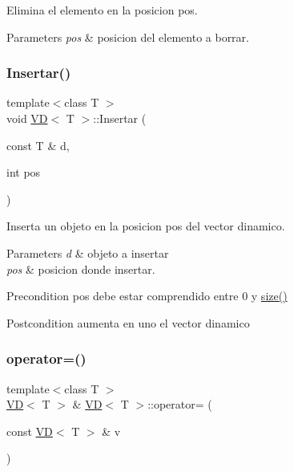 Elimina el elemento en la posicion pos. 


\begin{DoxyParams}{Parameters}
{\em pos} & posicion del elemento a borrar. \\
\hline
\end{DoxyParams}
\mbox{\label{class_v_d_aded65b5f02cceb9780303afd5c88acb8}} 
\subsubsection{\texorpdfstring{Insertar()}{Insertar()}}
{\footnotesize\ttfamily template$<$class T $>$ \\
void \hyperlink{class_v_d}{VD}$<$ T $>$\+::Insertar (\begin{DoxyParamCaption}\item[{const T \&}]{d,  }\item[{int}]{pos }\end{DoxyParamCaption})}



Inserta un objeto en la posicion pos del vector dinamico. 


\begin{DoxyParams}{Parameters}
{\em d} & objeto a insertar \\
\hline
{\em pos} & posicion donde insertar. \\
\hline
\end{DoxyParams}
\begin{DoxyPrecond}{Precondition}
pos debe estar comprendido entre 0 y \hyperlink{class_v_d_a411ad026db1c8e0617d9031f1f1017a5}{size()} 
\end{DoxyPrecond}
\begin{DoxyPostcond}{Postcondition}
aumenta en uno el vector dinamico 
\end{DoxyPostcond}
\mbox{\label{class_v_d_a645b65a6343059cd921f6a2856c97249}} 
\subsubsection{\texorpdfstring{operator=()}{operator=()}}
{\footnotesize\ttfamily template$<$class T $>$ \\
\hyperlink{class_v_d}{VD}$<$ T $>$ \& \hyperlink{class_v_d}{VD}$<$ T $>$\+::operator= (\begin{DoxyParamCaption}\item[{const \hyperlink{class_v_d}{VD}$<$ T $>$ \&}]{v }\end{DoxyParamCaption})}



